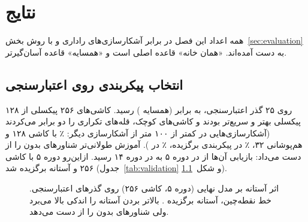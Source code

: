 \chapter{نتایج}
\label{ch:results}

همه اعداد این فصل در برابر آشکارسازی‌های راداری  و با روش بخش~\ref{sec:evaluation}
به دست آمده‌اند. «همان خانه» قاعده اصلی است و «همسایه» قاعده آسان‌گیرتر.

\section{انتخاب پیکربندی روی اعتبارسنجی}
روی ۲۵ گذر اعتبارسنجی،  به  برابر  (همسایه ) رسید.
کاشی‌های ۲۵۶ پیکسلی از ۱۲۸ پیکسلی بهتر و سریع‌تر بودند و کاشی‌های کوچک، قله‌های تکراری
را دو برابر می‌کردند (آشکارسازی‌هایی در کمتر از ۱۰۰ متر از آشکارسازی دیگر: ٪ با
کاشی ۱۲۸ و هم‌پوشانی ۳۲، ٪ در پیکربندی برگزیده، ٪ در ). آموزش
طولانی‌تر شناورهای بدون  را از دست می‌داد: بازیابی آن‌ها از  در دوره ۵ به
 در دوره ۱۴ رسید. ازاین‌رو دوره ۵ با کاشی ۲۵۶ و آستانه  برگزیده شد
(جدول~\ref{tab:validation} و شکل~\ref{fig:sweep}).



\begin{figure}[htbp]
\centering
{}
\caption[اثر آستانه روی اعتبارسنجی]{اثر آستانه بر مدل نهایی (دوره ۵، کاشی ۲۵۶) روی گذرهای اعتبارسنجی. خط نقطه‌چین،
آستانه برگزیده . بالاتر بردن آستانه  را اندکی بالا می‌برد ولی شناورهای بدون
 را از دست می‌دهد.}
\label{fig:sweep}
\end{figure}

